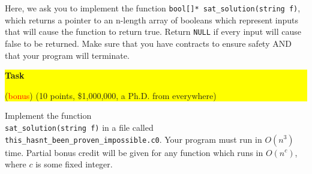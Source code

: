 \documentclass[12pt]{exam}
\begin{document}
Here, we ask you to implement the function \texttt{bool[]* sat\_solution(string f)}, which returns a pointer to an n-length array of booleans which represent inputs that will cause the function to return true. Return \texttt{NULL} if every input will cause false to be returned. Make sure that you have contracts to ensure safety AND that your program will terminate.

\bigskip%
\noindent%
\colorbox{yellow}{%
  {\bf Task %
    \addtocounter{taskcounter}{1}} %
  (\textcolor{red}{bonus})
  (10 points, \$1,000,000, a Ph.D. from everywhere)
}
Implement the function\\ \texttt{sat\_solution(string f)} in a file called \texttt{this\_hasnt\_been\_proven\_impossible.c0}. Your program must run in $O(n^3)$ time. Partial bonus credit will be given for any function which runs in $O(n^c)$, where $c$ is some fixed integer.
\end{document}
